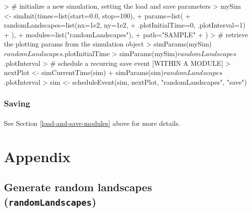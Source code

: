 \documentclass{article}
\begin{document}
\begin{Schunk}
\begin{Sinput}
> # initialize a new simulation, setting the load and save parameters
> mySim <- simInit(times=list(start=0.0, stop=100),
+                  params=list(
+                    randomLandscapes=list(nx=1e2, ny=1e2,
+                                 .plotInitialTime=0, .plotInterval=1)
+                    ),
+                  modules=list("randomLandscapes"),
+                  path="SAMPLE"
+ )
> # retrieve the plotting params from the simulation object
> simParams(mySim)$randomLandscapes$.plotInitialTime
> simParams(mySim)$randomLandscapes$.plotInterval
> # schedule a recurring save event [WITHIN A MODULE]
> nextPlot <- simCurrentTime(sim) + simParams(sim)$randomLandscapes$.plotInterval
> sim <- scheduleEvent(sim, nextPlot, "randomLandscapes", "save")
\end{Sinput}
\end{Schunk}

\subsubsection{Saving}

\paragraph{}
See Section \ref{load-and-save-modules} above for more details.

\newpage
\appendix
\renewcommand{\thesection}{}
\section{Appendix}
\renewcommand{\thesubsection}{\Alph{subsection}}

\subsection{Generate random landscapes (\texttt{randomLandscapes})}
\end{document}
